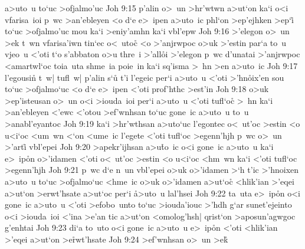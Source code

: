 a>uto~u
to`uc
>ofjalmo'uc\bibvsend
\vs Joh 9:15
p'alin
o>~un
>hr'wtwn
a>ut`on
ka`i
o<i
vfarisa~ioi
p~wc
>an'ebleyen
<o
d`e
e>~ipen
a>uto~ic
phl`on
>ep'ejhken
>ep`i\r{}
to`uc
>ofjalmo'uc
mou
ka`i
>eniy'amhn
ka`i
vbl'epw\bibvsend
\vs Joh 9:16
>'elegon
o>~un
>ek
t~wn
vfarisa'iwn
tin`ec
o<~utoc\r{}
<o
>'anjrwpoc
o>uk
>'estin
par`a
to~u
vjeo~u
<'oti
t`o
s'abbaton
o>u
thre~i
>'all\r{o}i
>'elegon
p~wc
d'unatai
>'anjrwpoc
<amartwl`oc
toia~uta
shme~ia
poie~in
ka`i
sq'isma
>~hn
>en
a>uto~ic\bibvsend
\vs Joh 9:17
l'egousi\r{n}
t~w|
tufl~w|
p'alin
s`u\r{}
t'i
l'egeic
per`i
a>uto~u
<'oti
>'hn\r{o}ix'en
sou
to`uc
>ofjalmo`uc
<o
d`e
e>~ipen
<'oti
prof'hthc
>est'in\bibvsend
\vs Joh 9:18
o>uk
>ep'isteusan
o>~un
o<i
>iouda~ioi
per`i
a>uto~u
<'oti
tufl`oc\r{}
>~hn
ka`i
>an'ebleyen
<'ewc
<'otou
>ef'wnhsan
to`uc
gone~ic
a>uto~u
to~u
>anabl'eyantoc\bibvsend
\vs Joh 9:19
ka`i
>hr'wthsan
a>uto`uc
l'egontec
o<~ut'oc
>estin
<o
u<i`oc
<um~wn
<`on
<ume~ic
l'egete
<'oti
tufl`oc
>egenn'hjh
p~wc
o>~un
>'arti\r{}
vbl'epei\bibvsend
\vs Joh 9:20
>apekr'ijhsan
a>u\r{t}o~ic
o<i
gone~ic
a>uto~u
ka`i
e>~ip\r{o}n
o>'idamen
<'oti
o<~ut'oc
>estin
<o
u<i`oc
<hm~wn
ka`i
<'oti
tufl`oc
>egenn'hjh\bibvsend
\vs Joh 9:21
p~wc
d`e
n~un
vbl'epei
o>uk
o>'idamen
>`h
t'ic
>'hnoixen
a>uto~u
to`uc
>ofjalmo`uc
<hme~ic
o>uk
o>'idamen
a>ut`oc\r{}
<hlik'ian
>'eqei
a>ut`on
>erwt'hsate
a>ut`oc
per`i
\r{a}>uto~u
lal'hsei\bibvsend
\vs Joh 9:22
ta~uta
e>~ip\r{o}n
o<i
gone~ic
a>uto~u
<'oti
>efobo~unto
to`uc
>iouda'iouc
>'hdh
g`ar
sunet'ejeinto
o<i
>iouda~ioi
<'ina
>e'an
tic
a>ut`on
<omolog'hsh|
qrist`on
>aposun'agwgoc
g'enhtai\bibvsend
\vs Joh 9:23
di`a
to~uto
o<i
gone~ic
a>uto~u
e>~ip\r{o}n
<'oti
<hlik'ian
>'eqei
a>ut`on
>e\r{r}wt'hsate\bibvsend
{}
\vs Joh 9:24
>ef'wnhsan
o>~un
>ek\r{}
